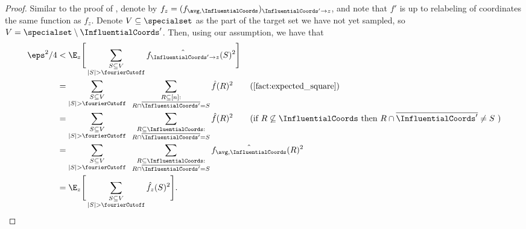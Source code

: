 \begin{proof}
Similar to the proof of , denote by $f_{z} = (f_{\avg, \InfluentialCoords})_{\InfluentialCoords' \to z}$, and note that $f'$ is up to relabeling of coordinates the same function as $f_z$. Denote $V\subseteq\specialset$ as the part of the target set we have not yet sampled, so $V = \specialset\setminus \InfluentialCoords'$. Then, using our assumption, we have that 
\begin{align*}
    \eps^2/4 &<  \E_z\Bigg[\sum_{\substack{S \subseteq V \\ |S| > \fourierCutoff}} \hat{f_{\InfluentialCoords' \to z}}(S)^2\Bigg] \\
    &=\sum_{\substack{S \subseteq V \\ |S| > \fourierCutoff}}\;\;\sum_{\substack{R\subseteq [n] :\\R\cap\overline{\InfluentialCoords'} = S }}\hat{f}(R)^2 \tag{\Cref{fact:expected_square}}\\
    &= \sum_{\substack{S \subseteq V \\ |S| > \fourierCutoff}}\;\;\sum_{\substack{R\subseteq \InfluentialCoords :\\R\cap\overline{\InfluentialCoords'} = S }}\hat{f}(R)^2
    \tag{if $R\not\subseteq\InfluentialCoords$ then $R\cap\overline{\InfluentialCoords'} \neq S$ }
    \\
    &= \sum_{\substack{S \subseteq V \\ |S| > \fourierCutoff}}\;\;\sum_{\substack{R\subseteq \InfluentialCoords :\\R\cap\overline{\InfluentialCoords'} = S }}\hat{f_{\avg, \InfluentialCoords}}(R)^2
    \\
    &= \E_z\Bigg[\sum_{\substack{S \subseteq V \\ |S| > \fourierCutoff}} \hat{f_{z}}(S)^2\Bigg].
\end{align*}



\end{proof}
